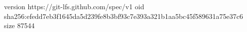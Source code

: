 version https://git-lfs.github.com/spec/v1
oid sha256:efedd7eb3f1645da5d239fe8b3bf93c7e393a321b1aa5bc45f589631a75e37c6
size 87544
